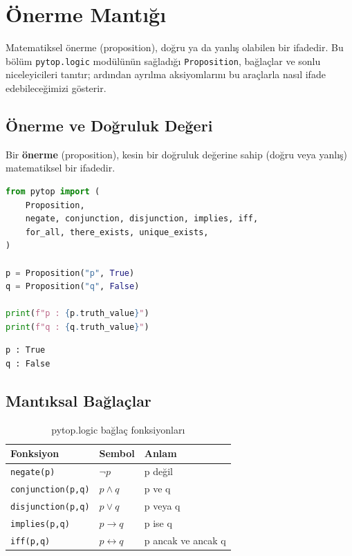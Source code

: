 \chapter{Önerme Mantığı}
\label{ch:propositional_logic}

Matematiksel önerme (proposition), doğru ya da yanlış olabilen bir ifadedir.
Bu bölüm \texttt{pytop.logic} modülünün sağladığı \texttt{Proposition},
bağlaçlar ve sonlu niceleyicileri tanıtır; ardından ayrılma aksiyomlarını
bu araçlarla nasıl ifade edebileceğimizi gösterir.

\section{Önerme ve Doğruluk Değeri}
\label{sec:proposition}

\begin{definition}[Önerme]
Bir \textbf{önerme} (proposition), kesin bir doğruluk değerine sahip
(doğru veya yanlış) matematiksel bir ifadedir.
\end{definition}

\begin{lstlisting}[language=Python, caption={Temel önermeler}]
from pytop import (
    Proposition,
    negate, conjunction, disjunction, implies, iff,
    for_all, there_exists, unique_exists,
)

p = Proposition("p", True)
q = Proposition("q", False)

print(f"p : {p.truth_value}")
print(f"q : {q.truth_value}")
\end{lstlisting}

\begin{lstlisting}[style=output]
p : True
q : False
\end{lstlisting}

\section{Mantıksal Bağlaçlar}
\label{sec:connectives}

\begin{table}[h]
\centering
\begin{tabular}{lll}
\toprule
\textbf{Fonksiyon} & \textbf{Sembol} & \textbf{Anlam} \\
\midrule
\texttt{negate(p)}        & $\neg p$       & p değil \\
\texttt{conjunction(p,q)} & $p \wedge q$   & p ve q \\
\texttt{disjunction(p,q)} & $p \vee q$     & p veya q \\
\texttt{implies(p,q)}     & $p \to q$      & p ise q \\
\texttt{iff(p,q)}         & $p \leftrightarrow q$ & p ancak ve ancak q \\
\bottomrule
\end{tabular}
\caption{pytop.logic bağlaç fonksiyonları}
\end{table}

